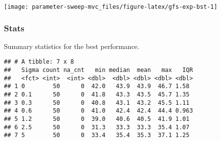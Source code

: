 \documentclass[]{book}
\newenvironment{Shaded}{\begin{snugshade}}{\end{snugshade}}
\newcommand{\DataTypeTok}[1]{\textcolor[rgb]{0.13,0.29,0.53}{#1}}
\newcommand{\KeywordTok}[1]{\textcolor[rgb]{0.13,0.29,0.53}{\textbf{#1}}}
\newcommand{\NormalTok}[1]{#1}
\newcommand{\OperatorTok}[1]{\textcolor[rgb]{0.81,0.36,0.00}{\textbf{#1}}}
\newcommand{\OtherTok}[1]{\textcolor[rgb]{0.56,0.35,0.01}{#1}}
\newcommand{\StringTok}[1]{\textcolor[rgb]{0.31,0.60,0.02}{#1}}
\begin{document}
\texttt{[image: parameter-sweep-mvc\_files/figure-latex/gfs-exp-bst-1]}

\hypertarget{stats-20}{%
\subsubsection{Stats}\label{stats-20}}

Summary statistics for the best performance.

\begin{Shaded}
\end{Shaded}

\begin{verbatim}
## # A tibble: 7 x 8
##   Sigma count na_cnt   min median  mean   max   IQR
##   <fct> <int>  <int> <dbl>  <dbl> <dbl> <dbl> <dbl>
## 1 0        50      0  42.0   43.9  43.9  46.7 1.58 
## 2 0.1      50      0  41.8   43.3  43.5  45.7 1.35 
## 3 0.3      50      0  40.8   43.1  43.2  45.5 1.11 
## 4 0.6      50      0  41.0   42.4  42.4  44.4 0.963
## 5 1.2      50      0  39.0   40.6  40.5  41.9 1.01 
## 6 2.5      50      0  31.3   33.3  33.3  35.4 1.07 
## 7 5        50      0  33.4   35.4  35.3  37.1 1.25
\end{verbatim}
\end{document}
